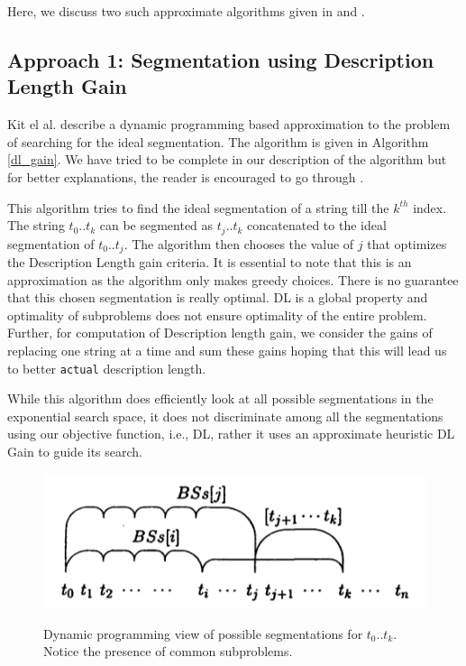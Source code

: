 \documentclass[runningheads]{llncs}
\begin{document}
Here, we discuss two such approximate algorithms given in \cite{kitt1999unsupervised} and \cite{zhikov2013efficient}.

\subsection{Approach 1: Segmentation using Description Length Gain}

Kit el al. \cite{kitt1999unsupervised} describe a dynamic programming based approximation to the problem of searching for the ideal segmentation. The algorithm is given in Algorithm \ref{dl_gain}. We have tried to be complete in our description of the algorithm but for better explanations, the reader is encouraged to go through \cite{kitt1999unsupervised}.

This algorithm tries to find the ideal segmentation of a string till the $k^{th}$ index. The string $t_0..t_k$ can be segmented as $t_j..t_k$ concatenated to the ideal segmentation of $t_0..t_j$. The algorithm then chooses the value of $j$ that optimizes the Description Length gain criteria. It is essential to note that this is an approximation as the algorithm only makes greedy choices. There is no guarantee that this chosen segmentation is really optimal. DL is a global property and optimality of subproblems does not ensure optimality of the entire problem. Further, for computation of Description length gain, we consider the gains of replacing one string at a time and sum these gains hoping that this will lead us to better \texttt{actual} description length.

While this algorithm does efficiently look at all possible segmentations in the exponential search space, it does not discriminate among all the segmentations using our objective function, i.e., DL, rather it uses an approximate heuristic DL Gain to guide its search.

\begin{figure}[b]
\centering
\includegraphics[width=0.6\linewidth]{pics/viterbi_seg.png}
\label{viterbi_seg}
\caption{Dynamic programming view of possible segmentations for $t_0..t_k$. Notice the presence of common subproblems.}
\end{figure}
\end{document}
